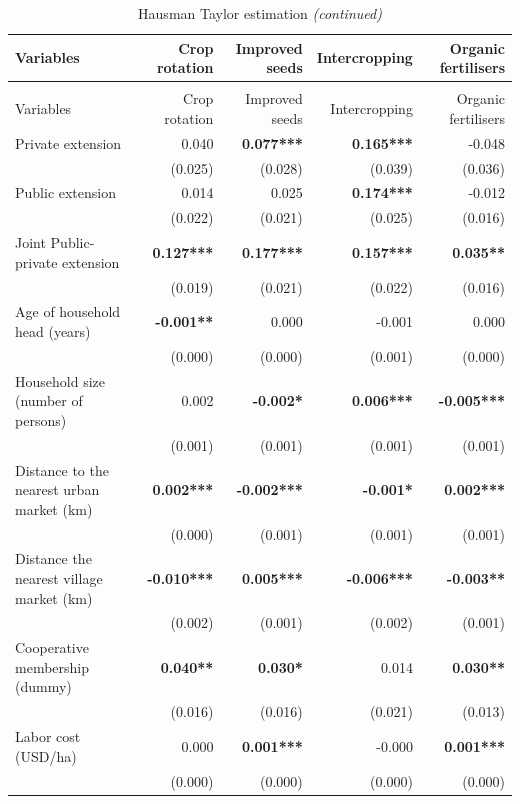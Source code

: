 \documentclass[
]{article}
\begin{document}
\begin{longtable}[t]{lrrrr}
\caption{\label{tab:unnamed-chunk-9}Hausman Taylor estimation}\\
\toprule
Variables & Crop rotation & Improved seeds & Intercropping & Organic fertilisers\\
\midrule
\endfirsthead
\caption[]{\label{tab:unnamed-chunk-9}Hausman Taylor estimation \textit{(continued)}}\\
\toprule
Variables & Crop rotation & Improved seeds & Intercropping & Organic fertilisers\\
\midrule
\endhead

\endfoot
\bottomrule
\endlastfoot
Private extension & 0.040 & \textbf{0.077***} & \textbf{0.165***} & -0.048\\
 & (0.025) & (0.028) & (0.039) & (0.036)\\
Public extension & 0.014 & 0.025 & \textbf{0.174***} & -0.012\\
 & (0.022) & (0.021) & (0.025) & (0.016)\\
Joint Public-private extension & \textbf{0.127***} & \textbf{0.177***} & \textbf{0.157***} & \textbf{0.035**}\\
 & (0.019) & (0.021) & (0.022) & (0.016)\\
Age of household head (years) & \textbf{-0.001**} & 0.000 & -0.001 & 0.000\\
 & (0.000) & (0.000) & (0.001) & (0.000)\\
Household size (number of persons) & 0.002 & \textbf{-0.002*} & \textbf{0.006***} & \textbf{-0.005***}\\
 & (0.001) & (0.001) & (0.001) & (0.001)\\
Distance to the nearest urban market (km) & \textbf{0.002***} & \textbf{-0.002***} & \textbf{-0.001*} & \textbf{0.002***}\\
 & (0.000) & (0.001) & (0.001) & (0.001)\\
Distance the nearest village market (km) & \textbf{-0.010***} & \textbf{0.005***} & \textbf{-0.006***} & \textbf{-0.003**}\\
 & (0.002) & (0.001) & (0.002) & (0.001)\\
Cooperative membership (dummy) & \textbf{0.040**} & \textbf{0.030*} & 0.014 & \textbf{0.030**}\\
 & (0.016) & (0.016) & (0.021) & (0.013)\\
Labor cost (USD/ha) & 0.000 & \textbf{0.001***} & -0.000 & \textbf{0.001***}\\
 & (0.000) & (0.000) & (0.000) & (0.000)\\

\end{longtable}
\end{document}
